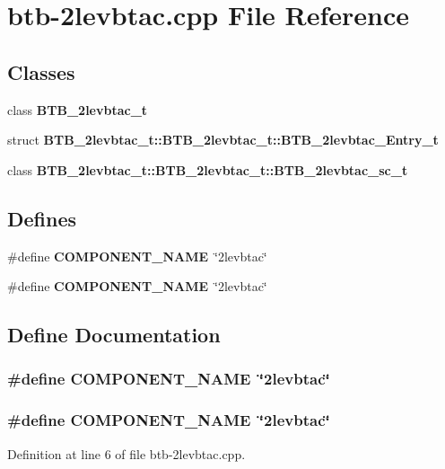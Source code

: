 \section{btb-2levbtac.cpp File Reference}
\label{btb-2levbtac_8cpp}
\subsection*{Classes}
\begin{CompactItemize}
\item 
class {\bf BTB\_\-2levbtac\_\-t}
\item 
struct {\bf BTB\_\-2levbtac\_\-t::BTB\_\-2levbtac\_\-t::BTB\_\-2levbtac\_\-Entry\_\-t}
\item 
class {\bf BTB\_\-2levbtac\_\-t::BTB\_\-2levbtac\_\-t::BTB\_\-2levbtac\_\-sc\_\-t}
\end{CompactItemize}
\subsection*{Defines}
\begin{CompactItemize}
\item 
\#define {\bf COMPONENT\_\-NAME}~\char`\"{}2levbtac\char`\"{}
\item 
\#define {\bf COMPONENT\_\-NAME}~\char`\"{}2levbtac\char`\"{}
\end{CompactItemize}


\subsection{Define Documentation}
\subsubsection[{COMPONENT\_\-NAME}]{\setlength{\rightskip}{0pt plus 5cm}\#define COMPONENT\_\-NAME~\char`\"{}2levbtac\char`\"{}}\label{zesto-bpred_8cpp_9146ade7ce24e3db226a973a59063892}


\subsubsection[{COMPONENT\_\-NAME}]{\setlength{\rightskip}{0pt plus 5cm}\#define COMPONENT\_\-NAME~\char`\"{}2levbtac\char`\"{}}\label{btb-2levbtac_8cpp_9146ade7ce24e3db226a973a59063892}




Definition at line 6 of file btb-2levbtac.cpp.